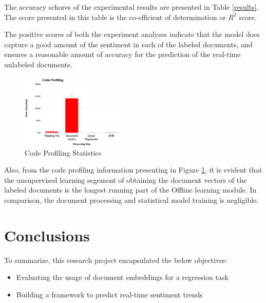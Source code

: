 \documentclass[conference]{IEEEtran}
\begin{document}
The accuracy schores of the experimental results are presented in Table \ref{results}. The score presented in this table is the co-efficient of determination or $R^2$ score.

\begin{table}[ht] \caption{Evaluation results} \label{results}
    \centering
\end{table}

The positive scores of both the experiment analyses indicate that the model does capture a good amount of the sentiment in each of the labeled documents, and ensures a reasonable amount of accuracy for the prediction of the real-time unlabeled documents.

\begin{figure}[h]
\centering
\includegraphics[width=0.45\textwidth]{images/code_profiling.png}
\caption{Code Profiling Statistics}
\label{fig:code-profiling}
\end{figure}

Also, from the code profiling information presenting in Figure \ref{fig:code-profiling}, it is evident that the unsupervised learning segement of obtaining the document vectors of the labeled documents is the longest running part of the Offline learning module. In comparison, the document processing and statistical model training is negligible.

\vspace{5mm}

\section{Conclusions}
To summarize, this research project encapsulated the below objectives:
\begin{itemize}
    \item Evaluating the usage of document embeddings for a regression task
    \item Building a framework to predict real-time sentiment trends
\end{itemize}
\end{document}
